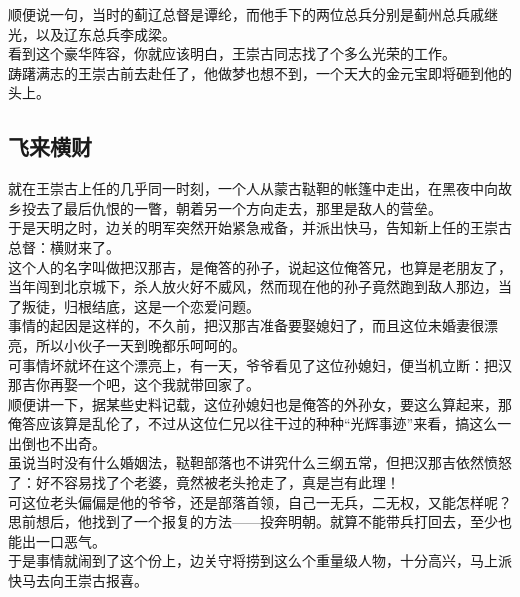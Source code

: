 \begin{multicols}{\theparacolNo}
顺便说一句，当时的蓟辽总督是谭纶，而他手下的两位总兵分别是蓟州总兵戚继光，以及辽东总兵李成梁。\\

看到这个豪华阵容，你就应该明白，王崇古同志找了个多么光荣的工作。\\

踌躇满志的王崇古前去赴任了，他做梦也想不到，一个天大的金元宝即将砸到他的头上。\\

\subsection{飞来横财}
就在王崇古上任的几乎同一时刻，一个人从蒙古鞑靼的帐篷中走出，在黑夜中向故乡投去了最后仇恨的一瞥，朝着另一个方向走去，那里是敌人的营垒。\\

于是天明之时，边关的明军突然开始紧急戒备，并派出快马，告知新上任的王崇古总督：横财来了。\\

这个人的名字叫做把汉那吉，是俺答的孙子，说起这位俺答兄，也算是老朋友了，当年闯到北京城下，杀人放火好不威风，然而现在他的孙子竟然跑到敌人那边，当了叛徒，归根结底，这是一个恋爱问题。\\

事情的起因是这样的，不久前，把汉那吉准备要娶媳妇了，而且这位未婚妻很漂亮，所以小伙子一天到晚都乐呵呵的。\\

可事情坏就坏在这个漂亮上，有一天，爷爷看见了这位孙媳妇，便当机立断：把汉那吉你再娶一个吧，这个我就带回家了。\\

顺便讲一下，据某些史料记载，这位孙媳妇也是俺答的外孙女，要这么算起来，那俺答应该算是乱伦了，不过从这位仁兄以往干过的种种“光辉事迹”来看，搞这么一出倒也不出奇。\\

虽说当时没有什么婚姻法，鞑靼部落也不讲究什么三纲五常，但把汉那吉依然愤怒了：好不容易找了个老婆，竟然被老头抢走了，真是岂有此理！\\

可这位老头偏偏是他的爷爷，还是部落首领，自己一无兵，二无权，又能怎样呢？\\

思前想后，他找到了一个报复的方法——投奔明朝。就算不能带兵打回去，至少也能出一口恶气。\\

于是事情就闹到了这个份上，边关守将捞到这么个重量级人物，十分高兴，马上派快马去向王崇古报喜。\\


\end{multicols}
